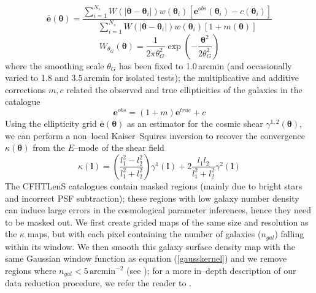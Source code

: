 \documentclass[reprint,aps,prd,superscriptaddress,showkeys,showpacs]{revtex4-1}
\begin{document}
\begin{equation}
\bar{\mathbf{e}}(\pmb{\theta}) = \frac{\sum_{i=1}^{N_s} W(\vert\pmb{\theta}-\pmb{\theta}_i\vert)w(\pmb{\theta}_i)[\mathbf{e}^{obs}(\pmb{\theta}_i)-c(\pmb{\theta}_i)]}{\sum_{i=1}^{N_s}W(\vert\pmb{\theta}-\pmb{\theta}_i\vert)w(\pmb{\theta}_i)[1+m(\pmb{\theta})]}
\end{equation} 
\begin{equation}
\label{gausskernel}
W_{\theta_G}(\pmb{\theta}) = \frac{1}{2\pi\theta_G^2}\exp{\left(-\frac{\pmb{\theta}^2}{2\theta_G^2}\right)}
\end{equation}
%
where the smoothing scale $\theta_G$ has been fixed to 1.0\,arcmin (and occasionally varied to 1.8 and 3.5\,arcmin for isolated tests); the multiplicative and additive corrections $m,c$ related the observed and true ellipticities of the galaxies in the catalogue
\begin{equation}
\mathbf{e}^{obs} = (1+m)\mathbf{e}^{true} + c
\end{equation}
%
Using the ellipticity grid $\bar{\mathbf{e}}(\pmb{\theta})$ as an estimator for the cosmic shear $\gamma^{1,2}(\pmb{\theta})$, we can perform a non--local Kaiser--Squires inversion to recover the convergence $\kappa(\pmb{\theta})$ from the $E$--mode of the shear field
%
\begin{equation}
\kappa(\mathbf{l}) = \left(\frac{l_1^2-l_2^2}{l_1^2+l_2^2}\right)\gamma^1(\mathbf{l}) + 2\frac{l_1l_2}{l_1^2+l_2^2}\gamma^2(\mathbf{l})
\end{equation}
%
The CFHTLenS catalogues contain masked regions (mainly due to bright stars and incorrect PSF subtraction); these regions with low galaxy number density can induce large errors in the cosmological parameter inferences, hence they need to be masked out. We first create grided maps of the same size and resolution as the $\kappa$ maps, but with each pixel containing the number of galaxies ($n_{gal}$) falling within its window. We then smooth this galaxy surface density map with the same Gaussian window function as equation (\ref{gausskernel}) and we remove regions where $n_{gal} < 5 \,\mathrm{arcmin}^{−2}$ (see \citep{CFHTMasato}); for a more in--depth description of our data reduction procedure, we refer the reader to \citep{Companion}. 

\end{document}
